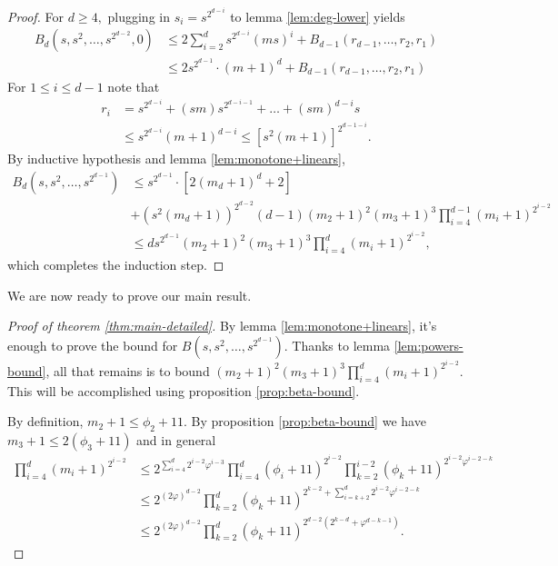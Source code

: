 \documentclass[10pt,a4paper]{amsart}
\theoremstyle{definition}
\begin{document}
\begin{proof}
    For $d \ge 4,$  plugging in $s_i = s^{2^{d-i}}$ to lemma \ref{lem:deg-lower} yields
    \begin{align*}
        B_d(s,s^2,\ldots,s^{2^{d-2}},0) &\le  2\sum_{i=2}^d s^{2^{d-i}} (ms)^i +  B_{d-1}(r_{d-1},\ldots,r_2,r_1)  \\
    &\le 2s^{2^{d-1}}\cdot (m+1)^d + B_{d-1}(r_{d-1},\ldots,r_2,r_1) 
    \end{align*}
    For $1\le i\le d-1$ note that
    \begin{align*}
        r_i &=  s^{2^{d-i}} + (s m) s^{2^{d-i-1}}+\ldots+(sm)^{d-i} s \\
        &\le s^{2^{d-i}}(m+1)^{d-i} \le [s^2(m+1)]^{2^{d-1-i}}.
    \end{align*}
    By inductive hypothesis and lemma \ref{lem:monotone+linears},
    \begin{align*}
        B_d(s,s^2,\ldots,s^{2^{d-1}}) &\le s^{2^{d-1}}\cdot [2(m_d+1)^d+2] \\
        &+(s^2(m_d+1))^{2^{d-2}} (d-1) (m_2+1)^2(m_3+1)^3 \prod_{i=4}^{d-1} (m_i+1)^{2^{i-2}} \\
        &\le d s^{2^{d-1}} (m_2+1)^2(m_3+1)^3\prod_{i=4}^d (m_i+1)^{2^{i-2}},
    \end{align*}
    which completes the induction step.
\end{proof}

We are now ready to prove our main result.

\begin{proof}[Proof of theorem \ref{thm:main-detailed}]
By lemma \ref{lem:monotone+linears}, it's enough to prove the bound for $B(s,s^2,\ldots,s^{2^{d-1}}).$ Thanks to lemma \ref{lem:powers-bound}, all that remains is to bound $(m_2+1)^2(m_3+1)^3\prod_{i=4}^d (m_i+1)^{2^{i-2}}.$ This will be accomplished using proposition \ref{prop:beta-bound}. 

By definition, $m_2+1 \le \phi_2+11.$ By proposition \ref{prop:beta-bound} we have $m_3+1 \le 2(\phi_3+11)$ and in general 
\begin{align*}
    \prod_{i=4}^d (m_i+1)^{2^{i-2}} &\le 2^{\sum_{i=4}^d 2^{i-2}\varphi^{i-3}} \prod_{i=4}^d (\phi_i+11)^{2^{i-2}} \prod_{k=2}^{i-2} (\phi_k+11)^{2^{i-2}\varphi^{i-2-k}} \\
    &\le 2^{(2\varphi)^{d-2}}  \prod_{k=2}^{d} (\phi_k+11)^{2^{k-2} +\sum_{i=k+2}^d 2^{i-2}\varphi^{i-2-k}} \\
    &\le 2^{(2\varphi)^{d-2}} \prod_{k=2}^d (\phi_k+11)^{2^{d-2}(2^{k-d}+\varphi^{d-k-1})}.
\end{align*}
    
\end{proof}
\end{document}
